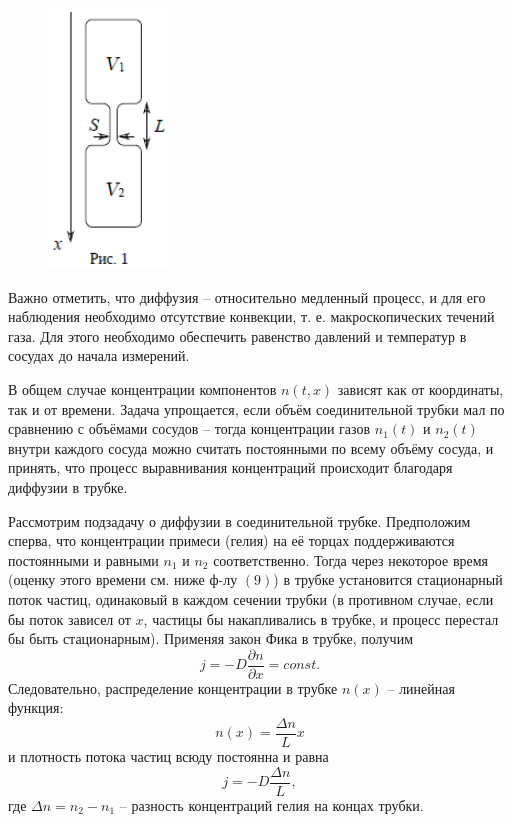 \documentclass[a4paper,11.5pt]{article} %
\begin{document}
\begin{figure} 
    \includegraphics{2211.png}
\end{figure}

Важно отметить, что диффузия -- относительно медленный процесс, и для его наблюдения необходимо отсутствие конвекции, т. е. макроскопических течений газа. Для этого необходимо обеспечить равенство давлений и температур в сосудах до начала измерений.

В общем случае концентрации компонентов $n(t, x)$ зависят как от координаты, так и от времени. Задача упрощается, если объём соединительной трубки мал по сравнению с объёмами сосудов -- тогда концентрации газов $n_1(t)$ и $n_2(t)$ внутри каждого сосуда можно считать постоянными по всему объёму сосуда, и принять, что процесс выравнивания концентраций происходит благодаря диффузии в трубке.

Рассмотрим подзадачу о диффузии в соединительной трубке. Предположим сперва, что концентрации примеси (гелия) на её торцах поддерживаются постоянными и равными $n_1$ и $n_2$ соответственно. Тогда через некоторое время (оценку этого времени см. ниже ф-лу $(9)$) в трубке установится стационарный поток частиц, одинаковый в каждом сечении трубки (в противном случае, если бы поток зависел от $x$, частицы бы накапливались в трубке, и процесс перестал бы быть стационарным). Применяя закон Фика в трубке, получим $$j = -D \dfrac{\partial n}{\partial x} = const.$$
Следовательно, распределение концентрации в трубке $n(x)$ -- линейная функция:
\begin{equation}
	n(x) = \dfrac{\Delta n}{L} x
\end{equation}
и плотность потока частиц всюду постоянна и равна
\begin{equation}
	j = -D \dfrac{\Delta n}{L},
\end{equation}
где $\Delta n = n_2 - n_1$ -- разность концентраций гелия на концах трубки.
\end{document}
